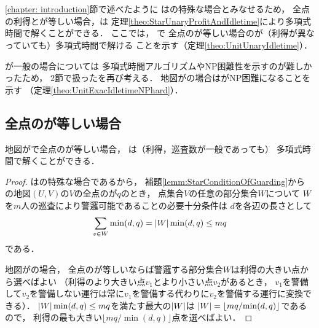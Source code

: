 \chapter{{\graphUnit}}
\label{chapter: unit}

\ref{chapter: introduction}節で述べたように
{\graphUnit}は{\graphStar}の特殊な場合とみなせるため，
全点の利得と{\maxIdletime}が等しい場合，{\patProb}は
定理\ref{theo:StarUnaryProfitAndIdletime}により多項式時間で解くことができる．
ここでは，
{\graphUnit}で
全点の{\maxIdletime}が等しい場合の{\patProb}が（利得が異なっていても）多項式時間で解ける
ことを示す（定理\ref{theo:UnitUnaryIdletime}）．

{\maxIdletime}が一般の場合については
多項式時間アルゴリズムやNP困難性を示すのが難しかったため，
2節で扱った{\timeSpecifiedPatProb}を再び考える．
地図が{\graphUnit}の場合は{\timeSpecifiedPatProb}がNP困難になることを示す
（定理\ref{theo:UnitExacIdletimeNPhard}）．



\section{全点の{\maxIdletime}が等しい場合}

\begin{theo}
  \label{theo:UnitUnaryIdletime}
  地図が{\graphUnit}で全点の{\maxIdletime}が等しい場合，
  {\patProb}は（利得，巡査数が一般であっても）
  多項式時間で解くことができる．
\end{theo}

\begin{proof}
  {\graphUnit}は{\graphStar}の特殊な場合であるから，
  補題\ref{lemm:StarConditionOfGuarding}から
  {\graphUnit}の地図$(U, V)$の$V$の全点の{\maxIdletime}が$q$のとき，
  点集合$V$の任意の部分集合$W$について
  $W$を$m$人の巡査により警邏可能であることの必要十分条件は
  $d$を各辺の長さとして
  \[
    \sum_{v \in W} \min(d, q) = \lvert{W}\rvert\min(d, q) \leq mq
  \]
  である．

  地図が{\graphUnit}の場合，
  全点の{\maxIdletime}が等しいならば警邏する部分集合$W$は利得の大きい点から選べばよい
  （利得のより大きい点$v_1$とより小さい点$v_2$があるとき，
  $v_1$を警備して$v_2$を警備しない運行は常に$v_1$を警備する代わりに$v_2$を警備する運行に変換できる）．
  $\lvert{W}\rvert\min(d, q) \leq mq$を満たす最大の$\lvert{W}\rvert$は
  $\lvert{W}\rvert = \left\lfloor {mq}/{\min(d, q)} \right\rfloor$であるので，
  利得の最も大きい$\lfloor {mq}/{\min(d, q)} \rfloor$点を選べばよい．
\end{proof}




